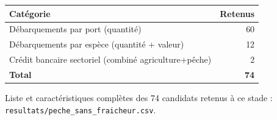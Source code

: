 \documentclass[11pt,a4paper]{article}
\begin{document}
\begin{center}
\begin{tabular}{lr}
\toprule
\textbf{Catégorie} & \textbf{Retenus} \\
\midrule
Débarquements par port (quantité) & 60 \\
Débarquements par espèce (quantité + valeur) & 12 \\
Crédit bancaire sectoriel (combiné agriculture+pêche) & 2 \\
\midrule
\textbf{Total} & \textbf{74} \\
\bottomrule
\end{tabular}
\end{center}

\begin{fichierbox}
Liste et caractéristiques complètes des 74 candidats retenus à ce stade : \texttt{resultats/peche\_sans\_fraicheur.csv}.
\end{fichierbox}
\end{document}
